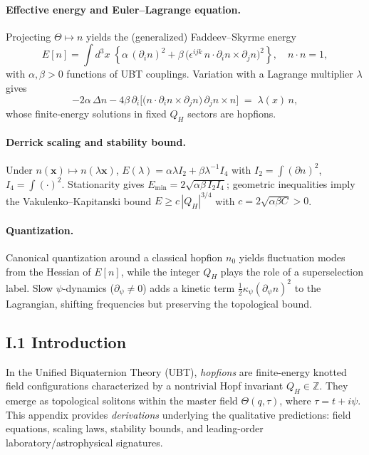 \paragraph{Effective energy and Euler--Lagrange equation.}
Projecting $\Theta\mapsto n$ yields the (generalized) Faddeev--Skyrme energy
\begin{equation}
E[n]=\int d^3x\;\left\{\alpha\,(\partial_i n)^2+\beta\,\big(\epsilon^{ijk}\,n\cdot\partial_i n\times\partial_j n\big)^2\right\},\quad n\cdot n=1,
\end{equation}
with $\alpha,\beta>0$ functions of UBT couplings.
Variation with a Lagrange multiplier $\lambda$ gives
\begin{equation}
-2\alpha\,\Delta n -4\beta\,\partial_i\Big[\big(n\cdot\partial_i n\times\partial_j n\big)\,\partial_j n\times n\Big] \;=\; \lambda(x)\, n,
\end{equation}
whose finite-energy solutions in fixed $Q_H$ sectors are hopfions.

\paragraph{Derrick scaling and stability bound.}
Under $n(\mathbf{x})\mapsto n(\lambda\mathbf{x})$, $E(\lambda)=\alpha\lambda I_2+\beta\lambda^{-1}I_4$ with $I_2=\int(\partial n)^2$, $I_4=\int(\cdot)^2$.
Stationarity gives $E_{\min}=2\sqrt{\alpha\beta\,I_2 I_4}$; geometric inequalities imply the Vakulenko--Kapitanski bound $E\ge c\,|Q_H|^{3/4}$ with $c=2\sqrt{\alpha\beta C}>0$.

\paragraph{Quantization.}
Canonical quantization around a classical hopfion $n_0$ yields fluctuation modes from the Hessian of $E[n]$, while the integer $Q_H$ plays the role of a superselection label.
Slow $\psi$-dynamics ($\partial_\psi\neq 0$) adds a kinetic term $\frac12\kappa_\psi(\partial_\psi n)^2$ to the Lagrangian, shifting frequencies but preserving the topological bound.


\subsection*{I.1 Introduction}
In the Unified Biquaternion Theory (UBT), \emph{hopfions} are finite-energy knotted field configurations characterized by a nontrivial Hopf invariant $Q_H\in\mathbb{Z}$. 
They emerge as topological solitons within the master field $\Theta(q,\tau)$, where $\tau=t+i\psi$. 
This appendix provides \emph{derivations} underlying the qualitative predictions: field equations, scaling laws, stability bounds, and leading-order laboratory/astrophysical signatures.

